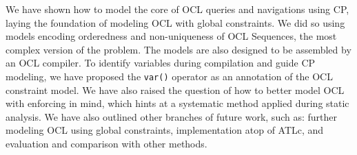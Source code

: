 We have shown how to model the core of OCL queries and navigations using CP, laying the foundation of modeling OCL with global constraints. We did so using models encoding orderedness and non-uniqueness of OCL Sequences, the most complex version of the problem.
The models are also designed to be assembled by an OCL compiler.
To identify variables during compilation and guide CP modeling, we have proposed the \texttt{var()} operator as an annotation of the OCL constraint model.
We have also raised the question of how to better model OCL with enforcing in mind, which hints at a systematic method applied during static analysis.
We have also outlined other branches of future work, such as: further modeling OCL using global constraints, implementation atop of ATLc, and evaluation and comparison with other methods.